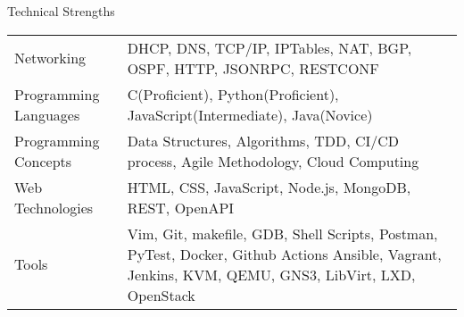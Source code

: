 \documentclass{resume} %
\begin{document}
    \begin{rSection}{Technical Strengths}
        \begin{tabularx}{\textwidth}{lX}%
            Networking & DHCP, DNS, TCP/IP, IPTables, NAT, BGP, OSPF, HTTP, JSONRPC, RESTCONF\\ [0.5ex]
            Programming Languages & C(Proficient), Python(Proficient), JavaScript(Intermediate), Java(Novice)\\ [0.5ex]
            Programming Concepts & Data Structures, Algorithms, TDD, CI/CD process, Agile Methodology, Cloud Computing\\ [0.5ex]
            Web Technologies & HTML, CSS, JavaScript, Node.js, MongoDB, REST, OpenAPI\\ [0.5ex]
            Tools & Vim, Git, makefile, GDB, Shell Scripts, Postman, PyTest, Docker, Github Actions \newline Ansible, Vagrant, Jenkins, KVM, QEMU, GNS3, LibVirt, LXD, OpenStack\\
        \end{tabularx}
        \begin{comment}
            Networking Concepts: TCP/IP, UDP, VLAN, STP, MPLS, DiffServ, ARP, DHCP, EIGRP, OSPF, BGP, DNS, NAT, VPN, ICMP, IPv6, LDP, RSVP, 802.11 standards, Policy Based Routing, IP SLAs, Network Security protocols.
            Cisco CLI, Wireshark, OpenStack, Iperf.
            Programming concepts: TDD, CI/CD, Agile, Cloud(AWS Cloud practitioner/Solutions Architect/Developer), Spring Framework
            Design Thinking
        \end{comment}
    \end{rSection}
\end{document}
